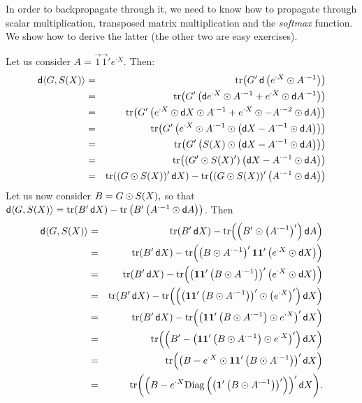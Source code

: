 \documentclass[pdflatex,sn-mathphys-num]{sn-jnl}%
\theoremstyle{thmstyleone}%
\theoremstyle{thmstyletwo}%
\theoremstyle{thmstylethree}%
\begin{document}
In order to backpropagate through it, we need to know how to propagate through
scalar multiplication, transposed matrix multiplication and the \emph{softmax}
function. 
We show how to derive the latter (the other two are easy exercises).

Let us consider \(A = \vec 1 \vec 1' e^{{\cdot}X}\). Then:
\begin{eqnarray*}
\dif\langle G,S(X)\rangle
&=& \trace\!\left(G' \dif \left(e^{{\cdot}X} \hadam A^{{\cdot}-1}\right)\right)\\
&=& \trace\!\left(G' \left(
    \dif e^{{\cdot}X} \hadam A^{{\cdot}-1}
    + e^{{\cdot}X} \hadam \dif A^{{\cdot}-1}\right)\right)\\
&=& \trace\!\left(G' \left(
    e^{{\cdot}X} \hadam \dif X \hadam A^{{\cdot}-1}
    + e^{{\cdot}X} \hadam -A^{{\cdot}-2} \hadam \dif A\right)\right)\\
&=& \trace\!\left(G' \left(e^{{\cdot}X} \hadam A^{{\cdot}-1}
    \hadam \left(\dif X - A^{{\cdot}-1} \hadam \dif A\right)\right)\right)\\
&=& \trace\!\left(G'
    \left(S(X) \hadam \left(\dif X - A^{{\cdot}-1} \hadam \dif A\right)\right)\right)\\
&=& \trace\!\left((G' \hadam S(X)')
    \left(\dif X - A^{{\cdot}-1} \hadam \dif A\right)\right)\\
&=& \trace((G \hadam S(X))' \dif X)
    - \trace\!\left((G \hadam S(X))' \left(A^{{\cdot}-1} \hadam \dif A\right)\right)
\end{eqnarray*}
Let us now consider \(B = G \odot S(X),\) so that \(\mathop{}\!\mathsf d\langle G,S(X)\rangle = \mathrm{tr}(B' \mathop{}\!\mathsf d X) - \mathrm{tr}\left(B' \left(A^{{\cdot}-1} \odot \mathop{}\!\mathsf d A\right)\right)\). Then
\begin{eqnarray*}
\dif\langle G,S(X)\rangle
&=& \trace(B' \dif X) - \trace\!\left(\left(B' \hadam \left(A^{{\cdot}-1}\right)'\right) \dif A\right)\\
&=& \trace(B' \dif X) - \trace\!\left(
    \left(B \hadam A^{{\cdot}-1}\right)' \vec 1 \vec 1'
    \left(e^{{\cdot}X} \hadam \dif X\right)
    \right)\\
&=& \trace(B' \dif X)
    - \trace\!\left(\left(\vec 1 \vec 1' \left(B \hadam A^{{\cdot}-1}\right)\right)'
    \left(e^{{\cdot}X} \hadam \dif X\right)\right)\\
&=& \trace(B' \dif X)
    - \trace\!\left(\left(\left(\vec 1 \vec 1' \left(B \hadam A^{{\cdot}-1}\right)\right)' \hadam \left(e^{{\cdot}X}\right)'\right)
    \dif X\right)\\
&=& \trace(B' \dif X)
    - \trace\!\left(\left(\vec 1 \vec 1' \left(B \hadam A^{{\cdot}-1}\right) \hadam e^{{\cdot}X}\right)'
    \dif X\right)\\
&=& \trace\!\left(
    \left(
    B' - \left(\vec 1 \vec 1' \left(B \hadam A^{{\cdot}-1}\right) \hadam e^{{\cdot}X}\right)'
    \right)\dif X\right)\\
&=& \trace\!\left(
    \left(
    B - e^{{\cdot}X} \hadam \vec 1 \vec 1' \left(B \hadam A^{{\cdot}-1}\right)
    \right)' \dif X\right)\\
&=& \trace\!\left(
    \left(
    B - e^{{\cdot}X} \Diag\left(\left(\vec 1' \left(B \hadam A^{{\cdot}-1}\right)\right)'\right)
    \right)' \dif X\right)\!.
\end{eqnarray*}
\end{document}
